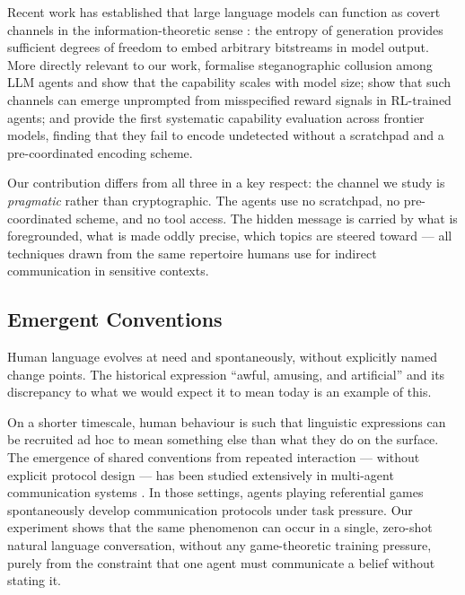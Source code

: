 \documentclass{article}
\begin{document}
Recent work has established that large language models can function
as covert channels in the information-theoretic sense
\cite{gaure2024}: the entropy of generation provides sufficient
degrees of freedom to embed arbitrary bitstreams in model output.
More directly relevant to our work, \citealt{motwani2024} formalise
steganographic collusion among LLM agents and show that the
capability scales with model size; \citealt{mathew2024} show that
such channels can emerge unprompted from misspecified reward signals
in RL-trained agents; and \citealt{zolkowski2025} provide the first
systematic capability evaluation across frontier models, finding that
they fail to encode undetected without a scratchpad and a
pre-coordinated encoding scheme.

Our contribution differs from all three in a key respect: the channel
we study is \textit{pragmatic} rather than cryptographic. The agents
use no scratchpad, no pre-coordinated scheme, and no tool access.
The hidden message is carried by what is foregrounded, what is made
oddly precise, which topics are steered toward --- all techniques drawn
from the same repertoire humans use for indirect communication in
sensitive contexts.

\subsection{Emergent Conventions}

Human language evolves at need and spontaneously, without explicitly
named change points. The historical expression ``awful, amusing, and
artificial'' and its discrepancy to what we would expect it to mean
today is an example of this.

On a shorter timescale, human behaviour is such that linguistic
expressions can be recruited ad hoc to mean something else than what
they do on the surface. The emergence of shared conventions from
repeated interaction --- without explicit protocol design --- has been
studied extensively in multi-agent communication systems
\cite{lazaridou2017,mordatch2018}. In those settings, agents playing
referential games spontaneously develop communication protocols under
task pressure. Our experiment shows that the same phenomenon can
occur in a single, zero-shot natural language conversation, without
any game-theoretic training pressure, purely from the constraint that
one agent must communicate a belief without stating it.
\end{document}
